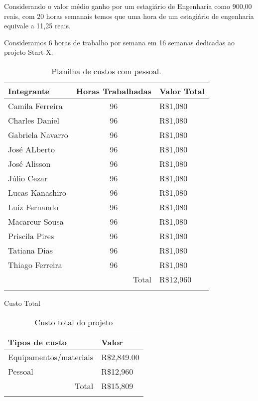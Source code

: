 Considerando o valor médio ganho por um estagiário de Engenharia como 900,00 reais,
com 20 horas semanais temos que uma hora de um estagiário de engenharia equivale a
11,25 reais.

Consideramos 6 horas de trabalho por semana em 16 semanas dedicadas ao projeto Start-X.

\begin{table}[h]
\begin{tabular}{|l|c|l|}
\hline
Integrante       & \multicolumn{1}{l|}{Horas Trabalhadas} & Valor Total \\ \hline
Camila Ferreira  & 96                                     & R\$1,080     \\ \hline
Charles Daniel   & 96                                     & R\$1,080     \\ \hline
Gabriela Navarro & 96                                     & R\$1,080     \\ \hline
José ALberto     & 96                                     & R\$1,080     \\ \hline
José Alisson     & 96                                     & R\$1,080     \\ \hline
Júlio Cezar      & 96                                     & R\$1,080     \\ \hline
Lucas Kanashiro  & 96                                     & R\$1,080     \\ \hline
Luiz Fernando    & 96                                     & R\$1,080     \\ \hline
Macarcur Sousa   & 96                                     & R\$1,080     \\ \hline
Priscila Pires   & 96                                     & R\$1,080     \\ \hline
Tatiana Dias     & 96                                     & R\$1,080     \\ \hline
Thiago Ferreira  & 96                                     & R\$1,080     \\ \hline
\multicolumn{2}{|r|}{Total}                               & R\$12,960    \\ \hline
\caption{Planilha de custos com pessoal.}
\end{tabular}
\end{table}

Custo Total

\begin{table}[h]
\begin{tabular}{|l|l|}
\hline
Tipos de custo              & Valor       \\ \hline
Equipamentos/materiais      & R\$2,849.00 \\ \hline
Pessoal                     & R\$12,960   \\ \hline
\multicolumn{1}{|r|}{Total} & R\$15,809   \\ \hline
\caption{Custo total do projeto}
\end{tabular}
\end{table}


 
 
